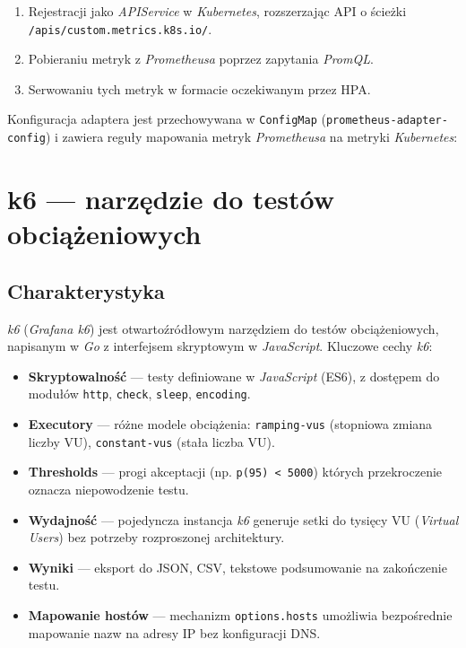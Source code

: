 \begin{enumerate}
  \item Rejestracji jako \textit{APIService} w \textit{Kubernetes}, rozszerzając API o ścieżki \texttt{/apis/custom.metrics.k8s.io/}.
  \item Pobieraniu metryk z \textit{Prometheusa} poprzez zapytania \textit{PromQL}.
  \item Serwowaniu tych metryk w formacie oczekiwanym przez HPA.
\end{enumerate}

Konfiguracja adaptera jest przechowywana w \texttt{ConfigMap} (\texttt{prometheus-adapter-config}) i zawiera reguły mapowania metryk \textit{Prometheusa} na metryki \textit{Kubernetes}:



\section{k6 — narzędzie do testów obciążeniowych}

\subsection{Charakterystyka}

\textit{k6} (\textit{Grafana k6}) jest otwartoźródłowym narzędziem do testów obciążeniowych, napisanym w \textit{Go} z interfejsem skryptowym w \textit{JavaScript}. Kluczowe cechy \textit{k6}:

\begin{itemize}
  \item \textbf{Skryptowalność} — testy definiowane w \textit{JavaScript} (ES6), z dostępem do modułów \texttt{http}, \texttt{check}, \texttt{sleep}, \texttt{encoding}.
  \item \textbf{Executory} — różne modele obciążenia: \texttt{ramping-vus} (stopniowa zmiana liczby VU), \texttt{constant-vus} (stała liczba VU).
  \item \textbf{Thresholds} — progi akceptacji (np. \texttt{p(95) < 5000}) których przekroczenie oznacza niepowodzenie testu.
  \item \textbf{Wydajność} — pojedyncza instancja \textit{k6} generuje setki do tysięcy VU (\textit{Virtual Users}) bez potrzeby rozproszonej architektury.
  \item \textbf{Wyniki} — eksport do JSON, CSV, tekstowe podsumowanie na zakończenie testu.
  \item \textbf{Mapowanie hostów} — mechanizm \texttt{options.hosts} umożliwia bezpośrednie mapowanie nazw na adresy IP bez konfiguracji DNS.
\end{itemize}


